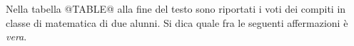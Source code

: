 Nella tabella @TABLE@ alla fine del testo
sono riportati i voti dei compiti 
in classe di matematica di due alunni.
Si dica quale fra le seguenti affermazioni è \emph{vera}.